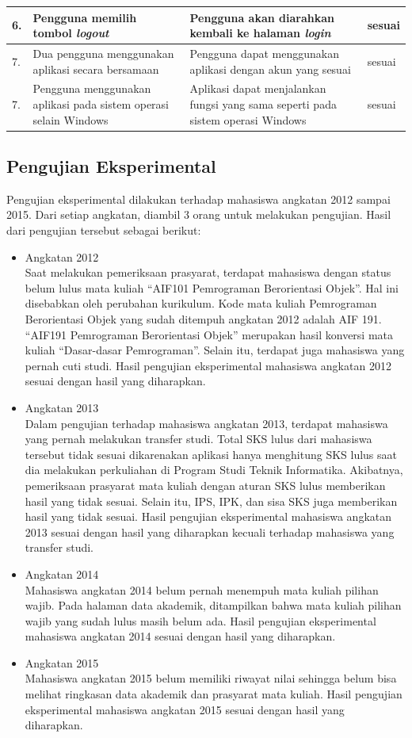 \begin{table}[H]
\begin{tabular}{|p{0.5cm}| p{3.5cm}| p{7cm}| p{2.25cm}|}
				6.	&	Pengguna memilih tombol \textit{logout}	&	Pengguna akan diarahkan kembali ke halaman \textit{login} &	sesuai	\\ \hline
				7.	& Dua pengguna menggunakan aplikasi secara bersamaan	&	Pengguna dapat menggunakan aplikasi dengan akun yang sesuai &	sesuai	\\ \hline
				7.	& Pengguna menggunakan aplikasi pada sistem operasi selain Windows	&	Aplikasi dapat menjalankan fungsi yang sama seperti pada sistem operasi Windows &	sesuai	\\ \hline
				\end{tabular}
				\label{table:hasilFungsional}
			\end{table}
			
		\subsection{Pengujian Eksperimental} 
		Pengujian eksperimental dilakukan terhadap mahasiswa angkatan 2012 sampai 2015. Dari setiap angkatan, diambil 3 orang untuk melakukan pengujian. Hasil dari pengujian tersebut sebagai berikut:
		\begin{itemize}
			\item Angkatan 2012\\
			Saat melakukan pemeriksaan prasyarat, terdapat mahasiswa dengan status belum lulus mata kuliah ``AIF101 Pemrograman Berorientasi Objek''. Hal ini disebabkan oleh perubahan kurikulum. Kode mata kuliah Pemrograman Berorientasi Objek yang sudah ditempuh angkatan 2012 adalah AIF 191. ``AIF191 Pemrograman Berorientasi Objek'' merupakan hasil konversi mata kuliah ``Dasar-dasar Pemrograman''. Selain itu, terdapat juga mahasiswa yang pernah cuti studi. Hasil pengujian eksperimental mahasiswa angkatan 2012 sesuai dengan hasil yang diharapkan.
			\item Angkatan 2013\\
			Dalam pengujian terhadap mahasiswa angkatan 2013, terdapat mahasiswa yang pernah melakukan transfer studi. Total SKS lulus dari mahasiswa tersebut tidak sesuai dikarenakan aplikasi hanya menghitung SKS lulus saat dia melakukan perkuliahan di Program Studi Teknik Informatika. Akibatnya, pemeriksaan prasyarat mata kuliah dengan aturan SKS lulus memberikan hasil yang tidak sesuai. Selain itu, IPS, IPK, dan sisa SKS juga memberikan hasil yang tidak sesuai. Hasil pengujian eksperimental mahasiswa angkatan 2013 sesuai dengan hasil yang diharapkan kecuali terhadap mahasiswa yang transfer studi.
			\item Angkatan 2014\\
			Mahasiswa angkatan 2014 belum pernah menempuh mata kuliah pilihan wajib. Pada halaman data akademik, ditampilkan bahwa mata kuliah pilihan wajib yang sudah lulus masih belum ada. Hasil pengujian eksperimental mahasiswa angkatan 2014 sesuai dengan hasil yang diharapkan.
			\item Angkatan 2015\\
			Mahasiswa angkatan 2015 belum memiliki riwayat nilai sehingga belum bisa melihat ringkasan data akademik dan prasyarat mata kuliah. Hasil pengujian eksperimental mahasiswa angkatan 2015 sesuai dengan hasil yang diharapkan.
		\end{itemize}
